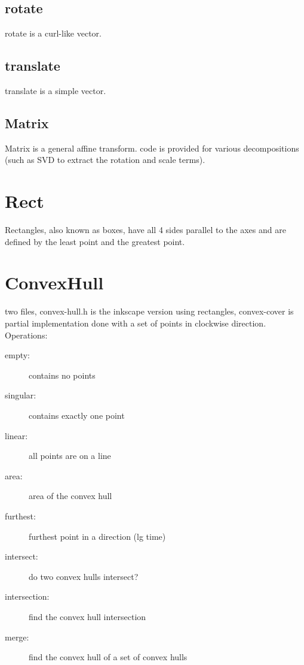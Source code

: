 \subsection{rotate}

rotate is a curl-like vector.

\subsection{translate}

translate is a simple vector.

\subsection{Matrix}

Matrix is a general affine transform.  code is provided for various
decompositions (such as SVD to extract the rotation and scale terms).

\section{Rect}

Rectangles, also known as boxes, have all 4 sides parallel to the axes
and are defined by the least point and the greatest point.

\section{ConvexHull}

two files, convex-hull.h is the inkscape version using rectangles,
convex-cover is partial implementation done with a set of points in
clockwise direction.  Operations:

\begin{description}
\item[empty:] contains no points
\item[singular:] contains exactly one point
\item[linear:] all points are on a line
\item[area:] area of the convex hull
\item[furthest:] furthest point in a direction (lg time)
\item[intersect:] do two convex hulls intersect?
\item[intersection:] find the convex hull intersection
\item[merge:] find the convex hull of a set of convex hulls
\end{description}

